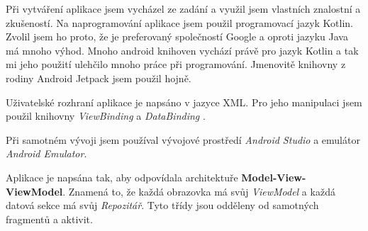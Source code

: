 \documentclass[../TakeYourPill.tex]{subfiles}
\begin{document}
Při vytváření aplikace jsem vycházel ze zadání a využil jsem vlastních znalostní a zkušeností. Na naprogramování aplikace jsem použil programovací jazyk Kotlin. Zvolil jsem ho proto, že je preferovaný společností Google a oproti jazyku Java má mnoho výhod. Mnoho android knihoven vychází právě pro jazyk Kotlin a tak mi jeho použití ulehčilo mnoho práce při programování. Jmenovitě knihovny z rodiny Android Jetpack \cite{jetpack} jsem použil hojně.

Uživatelské rozhraní aplikace je napsáno v jazyce XML. Pro jeho manipulaci jsem použil knihovny \textit{ViewBinding} \cite{viewbinding} a \textit{DataBinding} \cite{databinding}.

Při samotném vývoji jsem používal vývojové prostředí \textit{Android Studio} \cite{studio} a emulátor \textit{Android Emulator}.

Aplikace je napsána tak, aby odpovídala architektuře \textbf{Model-View-ViewModel}. Znamená to, že každá obrazovka má svůj \textit{ViewModel} a každá datová sekce má svůj \textit{Repozitář}. Tyto třídy jsou odděleny od samotných fragmentů a aktivit.

\vspace{6pt}


\end{document}
